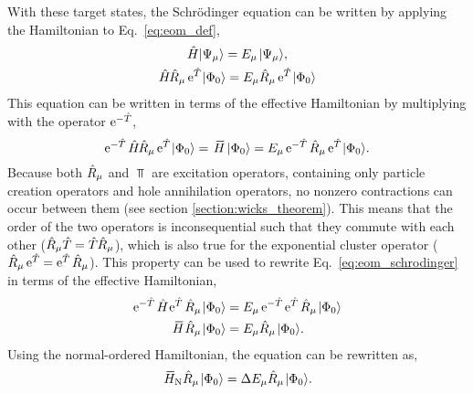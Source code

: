 \documentclass[thesis.tex]{subfiles}
\begin{document}
With these target states, the Schr\"odinger equation can be written by applying the Hamiltonian to Eq.\ \eqref{eq:eom_def},
\begin{gather}
  \Ham\ket{\Psi_{\mu}} = E_{\mu}\ket{\Psi_{\mu}}, \notag \\
  \Ham\Rop_{\mu}\E^{\Top}\refket = E_{\mu}\Rop_{\mu}\E^{\Top}\refket
\end{gather}
This equation can be written in terms of the effective Hamiltonian by multiplying with the operator $\operatorname{e}^{-\hat{T}\hspace{-0.25pt}}$,
\begin{equation} \label{eq:eom_schrodinger}
  \E^{-\Top}\Ham\Rop_{\mu}\E^{\Top}\refket = \EHam\refket = E_{\mu}\E^{-\Top}\Rop_{\mu}\E^{\Top}\refket.
\end{equation}
Because both $\hat{R}\hspace{-0.1pt}_{\mu}$ and $\Top$ are excitation operators, containing only particle creation operators and hole annihilation operators, no nonzero contractions can occur between them (see section \ref{section:wicks_theorem}).  This means that the order of the two operators is inconsequential such that they commute with each other ($\hat{R}\hspace{-0.1pt}_{\mu}\hat{T}\hspace{-0.25pt} = \hat{T}\hspace{-0.25pt}\hat{R}\hspace{-0.1pt}_{\mu}$), which is also true for the exponential cluster operator ($\hat{R}\hspace{-0.1pt}_{\mu}\operatorname{e}^{\hat{T}\hspace{-0.25pt}} = \operatorname{e}^{\hat{T}\hspace{-0.25pt}}\hat{R}\hspace{-0.1pt}_{\mu}$).  This property can be used to rewrite Eq.\ \eqref{eq:eom_schrodinger} in terms of the effective Hamiltonian,
\begin{align} \label{eq:eom_schrodinger1}
  \E^{-\Top}\Ham\E^{\Top}\Rop_{\mu}\refket &= E_{\mu}\E^{-\Top}\E^{\Top}\Rop_{\mu}\refket \notag \\
  \EHam\Rop_{\mu}\refket &= E_{\mu}\Rop_{\mu}\refket.
\end{align}
Using the normal-ordered Hamiltonian, the equation can be rewritten as,
\begin{equation} \label{eq:eom_schrodinger2}
  \EHamN\Rop_{\mu}\refket = \Ecorr_{\mu}\Rop_{\mu}\refket.
\end{equation}
\end{document}
